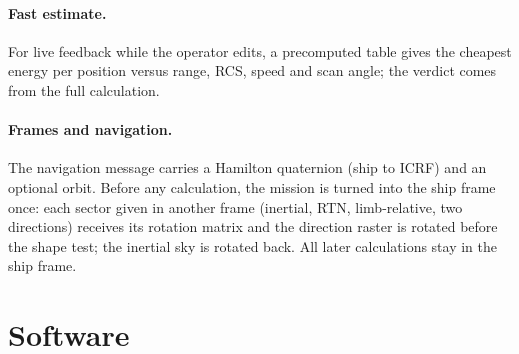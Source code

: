 \documentclass[11pt,a4paper]{article}
\begin{document}
\paragraph{Fast estimate.} For live feedback while the operator edits, a precomputed table gives the cheapest energy per
position versus range, RCS, speed and scan angle; the verdict comes from the full calculation.

\paragraph{Frames and navigation.}\label{sec:frames} The navigation message carries a Hamilton quaternion (ship to ICRF)
and an optional orbit. Before any calculation, the mission is turned into the ship frame once: each sector given in
another frame (inertial, RTN, limb-relative, two directions) receives its rotation matrix and the direction raster is
rotated before the shape test; the inertial sky is rotated back. All later calculations stay in the ship frame.

\section{Software}\label{sec:software}
\end{document}
